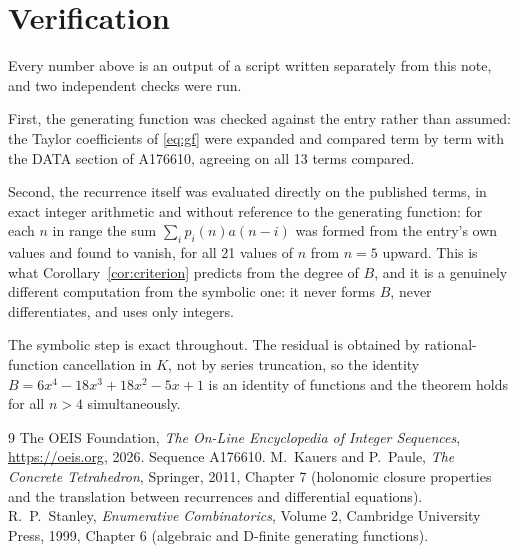 \documentclass[11pt,a4paper]{article}
\theoremstyle{plain}
\theoremstyle{definition}
\begin{document}
\section{Verification}

Every number above is an output of a script written separately from this note, and two
independent checks were run.

First, the generating function was checked against the entry rather than assumed: the
Taylor coefficients of \eqref{eq:gf} were expanded and compared term by term with the DATA
section of A176610, agreeing on all 13 terms compared.

Second, the recurrence itself was evaluated directly on the published terms, in exact
integer arithmetic and without reference to the generating function: for each $n$ in range
the sum $\sum_{i}p_{i}(n)a(n-i)$ was formed from the entry's own values and found to
vanish, for all 21 values of $n$ from $n=5$ upward. This is what
Corollary~\ref{cor:criterion} predicts from the degree of $B$, and it is a genuinely
different computation from the symbolic one: it never forms $B$, never differentiates, and
uses only integers.

The symbolic step is exact throughout. The residual is obtained by rational-function
cancellation in $K$, not by series truncation, so the identity $B=6 x^{4} - 18 x^{3} + 18 x^{2} - 5 x + 1$ is an
identity of functions and the theorem holds for all $n>4$ simultaneously.

\begin{thebibliography}{9}
 The OEIS Foundation, \emph{The On-Line Encyclopedia of Integer Sequences},
\url{https://oeis.org}, 2026. Sequence A176610.
 M.~Kauers and P.~Paule, \emph{The Concrete Tetrahedron}, Springer, 2011,
Chapter 7 (holonomic closure properties and the translation between recurrences and
differential equations).
 R.~P.~Stanley, \emph{Enumerative Combinatorics}, Volume 2, Cambridge
University Press, 1999, Chapter 6 (algebraic and D-finite generating functions).
\end{thebibliography}
\end{document}
